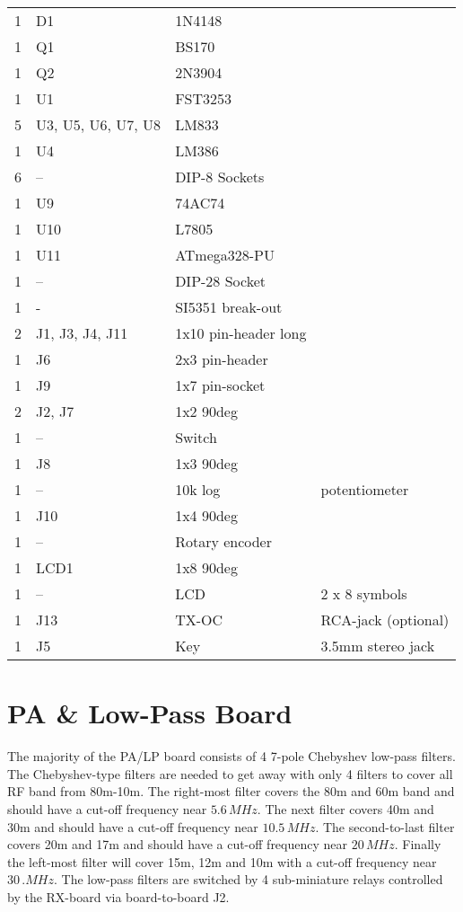 \documentclass[10pt, a4paper]{scrartcl}
\begin{document}
\begin{longtable}{|l|p{6cm}|l|l|}
1 & D1 & 1N4148 & \\
1 & Q1 & BS170 & \\
1 & Q2 & 2N3904 & \\
1 & U1 & FST3253 & \\
5 & U3, U5, U6, U7, U8 & LM833 & \\
1 & U4 & LM386 & \\ 
6 & -- & DIP-8 Sockets & \\
1 & U9 & 74AC74 & \\
1 & U10 & L7805 & \\
1 & U11 & ATmega328-PU & \\
1 & --  & DIP-28 Socket & \\
1 & - & SI5351 break-out & \\
2 & J1, J3, J4, J11 & 1x10 pin-header long & \\
1 & J6 & 2x3 pin-header & \\
1 & J9 & 1x7 pin-socket & \\
2 & J2, J7 & 1x2 90deg & \\
1 & -- & Switch & \\
1 & J8 & 1x3 90deg & \\
1 & -- & 10k log & potentiometer \\
1 & J10 & 1x4 90deg & \\
1 & -- & Rotary encoder & \\
1 & LCD1 & 1x8 90deg & \\
1 & -- & LCD & 2 x 8 symbols \\
1 & J13 & TX-OC & RCA-jack (optional) \\
1 & J5 & Key & 3.5mm stereo jack\\ \hline
\end{longtable}

\clearpage
\section{PA \& Low-Pass Board} \label{sec:pa}
The majority of the PA/LP board consists of 4 7-pole Chebyshev low-pass filters. The Chebyshev-type filters are needed to get away with only 4 filters to cover all RF band from 80m-10m. The right-most filter covers the 80m and 60m band and should have a cut-off frequency near $5.6\,MHz$. The next filter covers 40m and 30m and should have a cut-off frequency near $10.5\,MHz$. The second-to-last filter covers 20m and 17m and should have a cut-off frequency near $20\,MHz$. Finally the left-most filter will cover 15m, 12m and 10m with a cut-off frequency near $30\,.MHz$. The low-pass filters are switched by 4 sub-miniature relays controlled by the RX-board via board-to-board J2.
\end{document}
